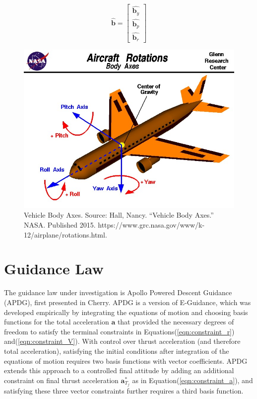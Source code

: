 \begin{equation}
\label{eqn:bodyframe}
\hat{\bm{b}} = 
\begin{bmatrix}
\hat{\bm{b}_y} \\
\hat{\bm{b}_p} \\
\hat{\bm{b}_r}
\end{bmatrix}
\end{equation}

\begin{figure}[H]
	\centering
	\begin{minipage}{4.3 in}
		\includegraphics[width=\linewidth]{Figures/bodyaxes.jpg}
		\caption{Vehicle Body Axes. Source: Hall, Nancy. “Vehicle Body Axes.” NASA. Published 2015.
            https://www.grc.nasa.gov/www/k-12/airplane/rotations.html. \label{fig:bodyaxes} }
	\end{minipage}
\end{figure}

\section{Guidance Law} \label{sec:guidancelaw}
The guidance law under investigation is Apollo Powered Descent Guidance (APDG), first presented in Cherry\:\cite{CHERRY}. APDG is a version of E-Guidance, which was developed empirically by integrating the equations of motion and choosing basis functions for the total acceleration $\bm{a}$ that provided the necessary degrees of freedom to satisfy the terminal constraints in Equations\:(\ref{eqn:constraint_r}) and\:(\ref{eqn:constraint_V}). With control over thrust acceleration (and therefore total acceleration), satisfying the initial conditions after integration of the equations of motion requires two basis functions with vector coefficients. APDG extends this approach to a controlled final attitude by adding an additional constraint on final thrust acceleration $\bm{a}^*_{T_f}$ as in Equation\:(\ref{eqn:constraint_a}), and satisfying these three vector constraints further requires a third basis function. 


